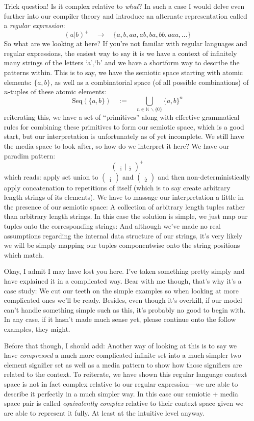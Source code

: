 \documentclass[twoside]{article}
\begin{document}
Trick question! Is it complex relative to \emph{what}? In such a case I would delve even further
into our compiler theory and introduce an alternate representation called a \emph{regular expression}:
$$ (a|b)^+\quad\to\quad\{a,b,aa,ab,ba,bb,aaa,\ldots\} $$
So what are we looking at here? If you're not familar with regular languages and regular expressions, the easiest way to say
it is we have a context of infinitely many strings of the letters `a',`b' and we have a shortform way to describe the patterns
within. This is to say, we have the semiotic space starting with atomic elements: $ \{a,b\} $, as well as a combinatorial space
(of all possible combinations) of $ n $-tuples of these atomic elements:
$$ \mbox{Seq}(\{a,b\})\quad :=\quad \bigcup_{n\in\mathbb{N}\,\backslash\{0\}}\{a,b\}^n $$
reiterating this, we have a set of ``primitives'' along with effective grammatical rules for combining these primitives to form
our semiotic space, which is a good start, but our interpretation is unfortunately as of yet incomplete.
We still have the media space to look after, so how do we interpret it here? We have our paradim pattern:
$$ (\ \!\underset{1}{\cdot}\,|\,\underset{2}{\cdot}\!\ )^+ $$
which reads: apply set union to $ (\ \!\underset{1}{\cdot}\!\ ) $ and $ (\ \!\underset{2}{\cdot}\!\ ) $ and then
non-deterministically apply concatenation to repetitions of itself (which is to say create arbitrary length strings of its elements).
We have to massage our interpretation a little in the presence of our semiotic space: A collection of arbitrary length tuples
rather than arbitrary length strings. In this case the solution is simple, we just map our tuples onto the corresponding
strings: And although we've made no real assumptions regarding the internal data structure of our strings,
it's very likely we will be simply mapping our tuples componentwise onto the string positions which match.

Okay, I admit I may have lost you here. I've taken something pretty simply and have explained it in a complicated way.
Bear with me though, that's why it's a case study: We cut our teeth on the simple examples so when looking at more complicated
ones we'll be ready. Besides, even though it's overkill, if our model can't handle something simple such as this, it's probably
no good to begin with. In any case, if it hasn't made much sense yet, please continue onto the follow examples, they might.

Before that though, I should add: Another way of looking at this is to say we have \emph{compressed} a much more complicated infinite
set into a much simpler two element signifier set as well as a media pattern to show how those signifiers are related to the context.
To reiterate, we have shown this regular language context space is not in fact complex relative to our regular expression---we
are able to describe it perfectly in a much simpler way. In this case our semiotic + media space pair is called
\emph{equivalently complex} relative to their context space given we are able to represent it fully.
At least at the intuitive level anyway.
\end{document}

